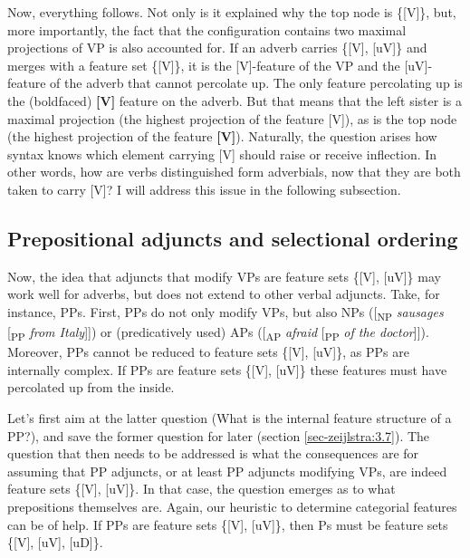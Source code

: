 \documentclass[output=paper
,modfonts
,nonflat]{langsci/langscibook}
\begin{document}
\begin{figure}[!h]
	\begin{exe}
		\exbox{
			\begin{forest}	
				[\{{[}\textbf{V}{]}\}
				[\{{[}V{]}\}]
				[\{{[}\textbf{V}{]}{,} {[}uV{]}\}] ]
		\end{forest}}
	\end{exe}
\end{figure} \vspace{-0.75cm}
\noindent Now, everything follows. Not only is it explained why the top node is \{[V]\}, but, more importantly, the fact that the configuration contains two maximal projections of VP is also accounted for. If an adverb carries \{[V], [uV]\} and merges with a feature set \{[V]\}, it is the [V]-feature of the VP and the [uV]-feature of the adverb that cannot percolate up. The only feature percolating up is the (boldfaced) \textbf{[V]} feature on the adverb. But that means that the left sister is a maximal projection (the highest projection of the feature [V]), as is the top node (the highest projection of the feature \textbf{[V]}). Naturally, the question arises how syntax knows which element carrying [V] should raise or receive inflection. In other words, how are verbs distinguished form adverbials, now that they are both taken to carry [V]? I will address this issue in the following subsection.

\subsection{Prepositional adjuncts and selectional ordering} \label{sec-zeijlstra:3.3}
Now, the idea that adjuncts that modify VPs are feature sets \{[V], [uV]\} may work well for adverbs, but does not extend to other verbal adjuncts. Take, for instance, PPs. First, PPs do not only modify VPs, but also NPs ([\textsubscript{NP} \textit{sausages} [\textsubscript{PP} \textit{from Italy}]]) or (predicatively used) APs ([\textsubscript{AP} \textit{afraid} [\textsubscript{PP} \textit{of the doctor}]]). Moreover, PPs cannot be reduced to feature sets \{[V], [uV]\}, as PPs are internally complex. If PPs are feature sets \{[V], [uV]\} these features must have percolated up from the inside.

Let’s first aim at the latter question (What is the internal feature structure of a PP?), and save the former question for later (section \ref{sec-zeijlstra:3.7}). The question that then needs to be addressed is what the consequences are for assuming that PP adjuncts, or at least PP adjuncts modifying VPs, are indeed feature sets \{[V], [uV]\}. In that case, the question emerges as to what prepositions themselves are. Again, our heuristic to determine categorial features can be of help. If PPs are feature sets \{[V], [uV]\}, then Ps must be feature sets \{[V], [uV], [uD]\}.
\end{document}
